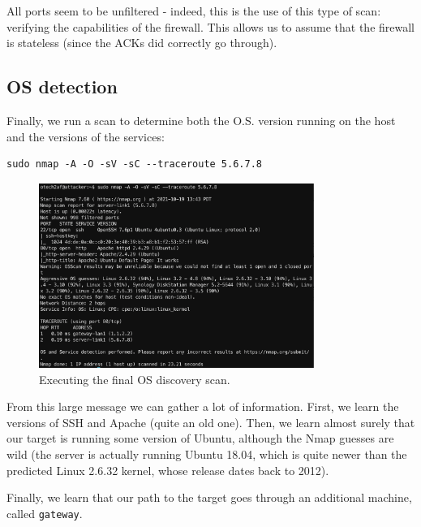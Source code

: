 \documentclass[a4paper,11pt,hidelinks]{article}
\begin{document}
All ports seem to be unfiltered - indeed, this is the use of this type of scan: verifying the capabilities of the firewall. This allows us to assume that the firewall is stateless (since the ACKs did correctly go through).

\subsection{OS detection}

Finally, we run a scan to determine both the O.S. version running on the host and the versions of the
services:

\begin{verbatim}
sudo nmap -A -O -sV -sC --traceroute 5.6.7.8  
\end{verbatim}

\begin{figure}[h!]
  \centering
  \includegraphics[width=0.8\textwidth]{../drawable/os-versions.png}
  \caption{Executing the final OS discovery scan.}
\end{figure}

From this large message we can gather a lot of information. First, we learn the versions of SSH and Apache (quite an old one). Then, we learn almost surely that our target is running some version of Ubuntu, although the Nmap guesses are wild (the server is actually running Ubuntu 18.04, which is quite newer than the predicted Linux 2.6.32 kernel, whose release dates back to 2012). 

Finally, we learn that our path to the target goes through an additional machine, called \verb=gateway=.
\endgroup
\end{document}
